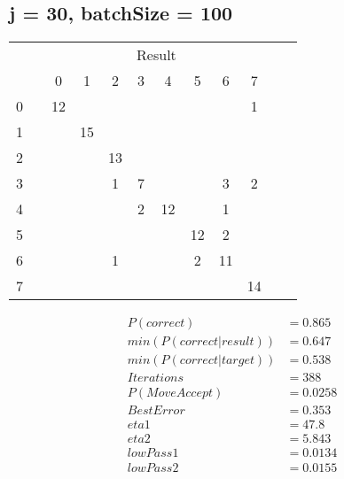 \documentclass[10pt, conference, compsocconf]{IEEEtran}
\begin{document}
\subsection{j = 30, batchSize = 100}
\begin{center}
\begin{tabular}{l*{10}{c}r}
& & & & & \multicolumn{2}{c}{Result}  & & \\
 &\vline& 0 & 1 & 2 & 3 & 4 & 5 & 6 & 7 \\
\hline
 0 &\vline&   12&    &    &    &    &    &    &   1\\
 1 &\vline&     &  15&    &    &    &    &    &   \\
 2 &\vline&     &    &  13&    &    &    &    &   \\
 3 &\vline&     &    &   1&   7&    &    &   3&   2\\
 4 &\vline&     &    &    &   2&  12&    &   1&   \\
 5 &\vline&     &    &    &    &    &  12&   2&   \\
 6 &\vline&     &    &   1&    &    &   2&  11&   \\
 7 &\vline&     &    &    &    &    &    &    &  14\\
\end{tabular}
\begin{align}
P( correct )  &=   0.865\\
min( P( correct |  result  ) )  &=   0.647\\
min( P( correct | target ) )  &=   0.538\\
Iterations &=   388\\
P(Move Accept) &=   0.0258\\
Best Error &=   0.353\\
eta1      &=  47.8\\
eta2      &=  5.843\\
lowPass1  &=  0.0134\\
lowPass2  &=  0.0155
\end{align}
\end{center}
\end{document}
